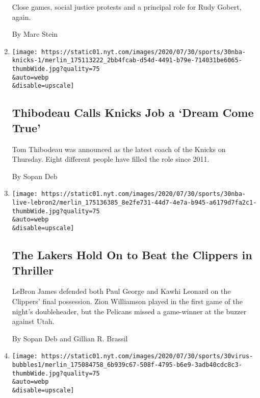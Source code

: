 \begin{enumerate}
  Close games, social justice protests and a principal role for Rudy
  Gobert, again.

  By Marc Stein
\item
  \href{/2020/07/30/sports/basketball/nba-knicks-coach-tom-thibodeau.html}{}

  \texttt{[image: https://static01.nyt.com/images/2020/07/30/sports/30nba-knicks-1/merlin\_175113222\_2bb4fcab-d54d-4491-b79e-714031be6065-thumbWide.jpg?quality=75\\\&auto=webp\\\&disable=upscale]}

  \hypertarget{thibodeau-calls-knicks-job-a-dream-come-true}{%
  \subsection{Thibodeau Calls Knicks Job a `Dream Come
  True'}\label{thibodeau-calls-knicks-job-a-dream-come-true}}

  Tom Thibodeau was announced as the latest coach of the Knicks on
  Thursday. Eight different people have filled the role since 2011.

  By Sopan Deb
\item
  \href{/2020/07/30/sports/basketball/clippers-lakers.html}{}

  \texttt{[image: https://static01.nyt.com/images/2020/07/30/sports/30nba-live-lebron2/merlin\_175136385\_8e2fe731-44d7-4e7a-b945-a6179d7fa2c1-thumbWide.jpg?quality=75\\\&auto=webp\\\&disable=upscale]}

  \hypertarget{the-lakers-hold-on-to-beat-the-clippers-in-thriller}{%
  \subsection{The Lakers Hold On to Beat the Clippers in
  Thriller}\label{the-lakers-hold-on-to-beat-the-clippers-in-thriller}}

  LeBron James defended both Paul George and Kawhi Leonard on the
  Clippers' final possession. Zion Williamson played in the first game
  of the night's doubleheader, but the Pelicans missed a game-winner at
  the buzzer against Utah.

  By Sopan Deb and Gillian R. Brassil
\item
  \href{/2020/07/30/sports/basketball/sports-bubble-nba-mlb.html}{}

  \texttt{[image: https://static01.nyt.com/images/2020/07/30/sports/30virus-bubbles1/merlin\_175084758\_6b939c67-508f-4795-b6e9-3adb40cdc8c3-thumbWide.jpg?quality=75\\\&auto=webp\\\&disable=upscale]}


\end{enumerate}
